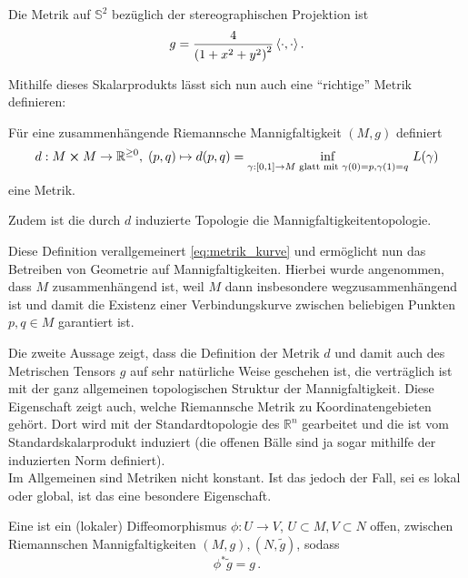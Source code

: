 \documentclass[../H_Analysis_main.tex]{subfiles}
\begin{document}
\begin{bsp}[Sphäre]
Die Metrik auf $\mathbb{S}^2$ bezüglich der stereographischen Projektion ist
\begin{equation}
g = \frac{4}{\qty(1 + x^2 + y^2)^2} \, \langle \cdot, \cdot \rangle \, .
\end{equation}
\end{bsp}


Mithilfe dieses Skalarprodukts lässt sich nun auch eine \enquote{richtige} Metrik definieren:
\begin{satz}[Abstand]
Für eine zusammenhängende Riemannsche Mannigfaltigkeit $(M, g)$ definiert
\begin{equation}\label{eq:distance_curve}
d: M \cross M \rightarrow \mathbb{R}^{\geq 0}, \; (p, q) \mapsto d(p, q) = \inf_{\gamma: [0, 1] \rightarrow M \text{ glatt mit } \gamma(0) = p, \gamma(1) = q} \, L(\gamma)
\end{equation}
eine Metrik.

Zudem ist die durch $d$ induzierte Topologie die Mannigfaltigkeitentopologie.
\end{satz}
Diese Definition verallgemeinert \eqref{eq:metrik_kurve} und ermöglicht nun das Betreiben von Geometrie auf Mannigfaltigkeiten. Hierbei wurde angenommen, dass $M$ zusammenhängend ist, weil $M$ dann insbesondere wegzusammenhängend ist und damit die Existenz einer Verbindungskurve zwischen beliebigen Punkten $p, q \in M$ garantiert ist.

Die zweite Aussage zeigt, dass die Definition der Metrik $d$ und damit auch des Metrischen Tensors $g$ auf sehr natürliche Weise geschehen ist, die verträglich ist mit der ganz allgemeinen topologischen Struktur der Mannigfaltigkeit. Diese Eigenschaft zeigt auch, welche Riemannsche Metrik zu Koordinatengebieten gehört. Dort wird mit der Standardtopologie des $\mathbb{R}^n$ gearbeitet und die ist vom Standardskalarprodukt induziert (die offenen Bälle sind ja sogar mithilfe der induzierten Norm definiert).\\


Im Allgemeinen sind Metriken nicht konstant. Ist das jedoch der Fall, sei es lokal oder global, ist das eine besondere Eigenschaft.

\begin{defi}[Isometrie]
Eine  ist ein (lokaler) Diffeomorphismus $\phi: U \rightarrow V$, $U \subset M, V \subset N$ offen, zwischen Riemannschen Mannigfaltigkeiten $(M, g), (N, \tilde{g})$, sodass
\begin{equation}
\phi^* \tilde{g} = g \, .
\end{equation}
\end{defi}
\end{document}
